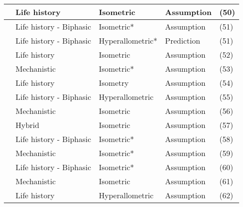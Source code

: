 \documentclass[a4paper]{article} %
\begin{document}
\begin{table}[H]
\begin{tabular}{|l|l|l|l|l|}
    \autocite{Roff2006}                     & Life history              & Isometric        & Assumption                        & (50)          \\ \hline
    \autocite{Quince2008}                   & Life history - Biphasic   & Isometric*       & Assumption                        & (51)          \\ \hline
    \autocite{Quince2008b}                  & Life history - Biphasic   & Hyperallometric* & Prediction                        & (51)          \\ \hline
    \autocite{Pecquerie2009}                & Life history              & Isometric        & Assumption                        & (52)          \\ \hline
    \autocite{kooijman2010dynamic}          & Mechanistic               & Isometric*       & Assumption                        & (53)          \\ \hline
    \autocite{Arendt2011}                   & Life history              & Isometry         & Assumption                        & (54)          \\ \hline
    \autocite{Ohnishi2011}                  & Life history - Biphasic   & Hyperallometric  & Assumption                        & (55)          \\ \hline
    \autocite{Brunel2013}                   & Mechanistic               & Isometric        & Assumption                        & (56)          \\ \hline
    \autocite{Charnov2013}                  & Hybrid                    & Isometric        & Assumption                        & (57)          \\ \hline
    \autocite{Boukal2014}                   & Life history - Biphasic   & Isometric*       & Assumption                        & (58)          \\ \hline
    \autocite{Kooijman2014a}                & Mechanistic               & Isometric*       & Assumption                        & (59)          \\ \hline
    \autocite{Minte-Vera2016a}              & Life history - Biphasic   & Isometric*       & Assumption                        & (60)          \\ \hline
    \autocite{Jusup2017}                    & Mechanistic               & Isometric        & Assumption                        & (61)          \\ \hline
    \autocite{Mangel2017}                   & Life history              & Hyperallometric  & Assumption                        & (62)          \\ \hline

\end{tabular}
\end{table}
\end{document}
